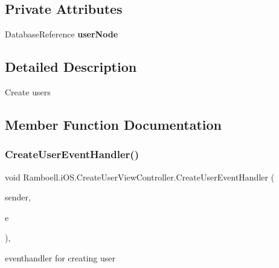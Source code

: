 \subsection*{Private Attributes}
\begin{DoxyCompactItemize}
\item 
\mbox{\label{class_ramboell_1_1i_o_s_1_1_create_user_view_controller_abe5c9ab167172a8eb0fcd84b0beff825}} 
Database\+Reference {\bfseries user\+Node}
\end{DoxyCompactItemize}


\subsection{Detailed Description}
Create users 



\subsection{Member Function Documentation}
\mbox{\label{class_ramboell_1_1i_o_s_1_1_create_user_view_controller_aead6b702a9f1f9e55ece583ff3483b9b}} 
\subsubsection{\texorpdfstring{Create\+User\+Event\+Handler()}{CreateUserEventHandler()}}
{\footnotesize\ttfamily void Ramboell.\+i\+O\+S.\+Create\+User\+View\+Controller.\+Create\+User\+Event\+Handler (\begin{DoxyParamCaption}\item[{object}]{sender,  }\item[{Event\+Args}]{e }\end{DoxyParamCaption})\hspace{0.3cm}{\ttfamily [inline]}, {\ttfamily [private]}}



eventhandler for creating user 


